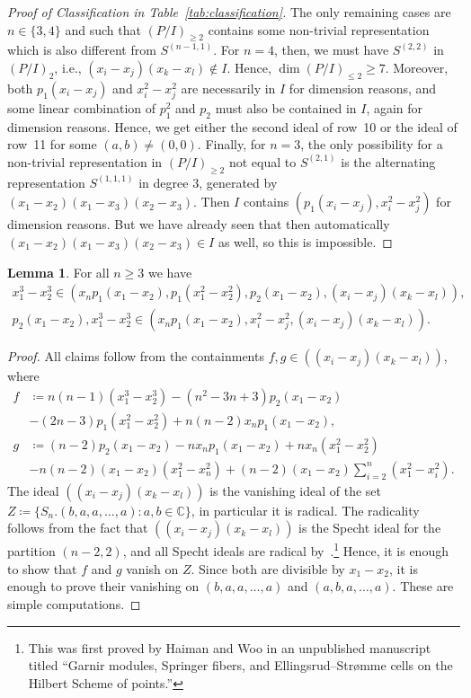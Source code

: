 \documentclass[11pt]{amsart}
\theoremstyle{definition}
\newtheorem{lemma}[theorem]{Lemma}
\newcommand{\CC}{\mathbb{C}}
\begin{document}
\begin{proof}[Proof of Classification in Table~\ref{tab:classification}]
    The only remaining cases are $n \in \{3,4\}$ and such that $(P/I)_{\geq 2}$ contains some non-trivial representation which is also different from $S^{(n-1,1)}$. For $n=4$, then, we must have $S^{(2,2)}$ in $(P/I)_2$, i.e., $(x_i-x_j)(x_k-x_l) \not\in I$. Hence, $\dim(P/I)_{\leq 2} \geq 7$. Moreover, both $p_1(x_i-x_j)$ and $x_i^2-x_j^2$ are necessarily in $I$ for dimension reasons, and some linear combination of $p_1^2$ and $p_2$ must also be contained in $I$, again for dimension reasons. Hence, we get either the second ideal of row~10 or the ideal of row~11 for some $(a,b) \neq (0,0)$. Finally, for $n=3$, the only possibility for a non-trivial representation in $(P/I)_{\geq 2}$ not equal to $S^{(2,1)}$ is the alternating representation $S^{(1,1,1)}$ in degree $3$, generated by $(x_1-x_2)(x_1-x_3)(x_2-x_3)$. Then $I$ contains $(p_1(x_i-x_j),x_i^2-x_j^2)$ for dimension reasons. But we have already seen that then automatically $(x_1-x_2)(x_1-x_3)(x_2-x_3) \in I$ as well, so this is impossible.
\end{proof}

\begin{lemma}\label{lem:relations}
    For all $n \geq 3$ we have
    \begin{gather*}
         x_1^3-x_2^3 \in (x_n p_1(x_1-x_2), p_1(x_1^2-x_2^2), p_2(x_1-x_2), (x_i-x_j)(x_k-x_l)), \\
        p_2(x_1-x_2), x_1^3-x_2^3 \in (x_n p_1(x_1-x_2),x_i^2-x_j^2,(x_i-x_j)(x_k-x_l)).
    \end{gather*}
\end{lemma}

\begin{proof}
    All claims follow from the containments $f,g \in ((x_i-x_j)(x_k-x_l))$, where
    \begin{align*}
    f &\coloneqq n(n-1)(x_1^3-x_2^3) - (n^2-3n+3)p_2(x_1-x_2) \\ &- (2n-3)p_1(x_1^2-x_2^2) + n(n-2)x_n p_1(x_1-x_2), \\
    g &\coloneqq (n-2)p_2(x_1-x_2) - n x_n p_1(x_1-x_2) + n x_n (x_1^2-x_2^2) \\ &- n(n-2)(x_1-x_2)(x_1^2-x_n^2) + (n-2)(x_1-x_2) \sum_{i=2}^n (x_1^2-x_i^2).
    \end{align*}
    The ideal $((x_i-x_j)(x_k-x_l))$ is the vanishing ideal of the set $Z \coloneqq \{S_n.(b,a,a,\ldots,a) : a,b \in \CC\}$, in particular it is radical. The radicality follows from the fact that $((x_i-x_j)(x_k-x_l))$ is the Specht ideal for the partition $(n-2,2)$, and all Specht ideals are radical by~\cite{Murai2022Specht}.\footnote{This was first proved by Haiman and Woo in an unpublished manuscript titled ``Garnir modules, Springer fibers, and Ellingsrud--Str{\o}mme cells on the Hilbert Scheme of points.''} Hence, it is enough to show that $f$ and $g$ vanish on  $Z$. Since both are divisible by $x_1-x_2$, it is enough to prove their vanishing on $(b,a,a,\ldots,a)$ and $(a,b,a,\ldots,a)$. These are simple computations.
\end{proof}
\end{document}
